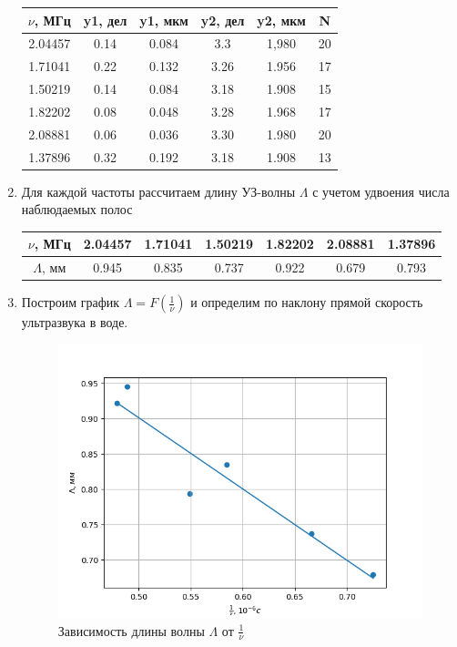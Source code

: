 \documentclass[a4paper,12pt]{article}
\begin{document}
\begin{enumerate}
    \begin{table}[h!]
    \centering
    \begin{tabular}{||c|c|c|c|c|c||}
    \hline
        $\nu$, МГц & y1, дел & y1, мкм & y2, дел & y2, мкм & N \\
        \hline\hline
        2.04457 & 0.14 & 0.084 & 3.3 & 1,980 & 20 \\
        1.71041 & 0.22 & 0.132 & 3.26 & 1.956 & 17 \\
        1.50219 & 0.14 & 0.084 & 3.18 & 1.908 & 15 \\
        1.82202 & 0.08 & 0.048 & 3.28 & 1.968 & 17 \\
        2.08881 & 0.06 & 0.036 & 3.30 & 1.980 & 20 \\
        1.37896 & 0.32 & 0.192 & 3.18 & 1.908 & 13 \\
        \hline
    \end{tabular}
    \end{table}

    \item Для каждой частоты рассчитаем длину УЗ-волны $\Lambda$ с учетом удвоения числа наблюдаемых полос
    \begin{table}[h!]
    \centering
    \begin{tabular}{||c||c|c|c|c|c|c||}
    \hline
        $\nu$, МГц & 2.04457 & 1.71041 & 1.50219 & 1.82202 & 2.08881 & 1.37896 \\
         \hline
        $\Lambda$, мм & 0.945 & 0.835 & 0.737 & 0.922 & 0.679 & 0.793 \\
        \hline
    \end{tabular}
    \end{table}

    \item Построим график $\Lambda=F(\frac{1}{\nu})$ и определим по наклону прямой скорость ультразвука в воде.

    \begin{figure}[h]
    \centering
    \includegraphics[width=0.8\linewidth]{graph2.png}
    \caption{Зависимость длины волны $\Lambda$ от $\frac{1}{\nu}$}
    \label{graph2}
    \end{figure}


\end{enumerate}
\end{document}
